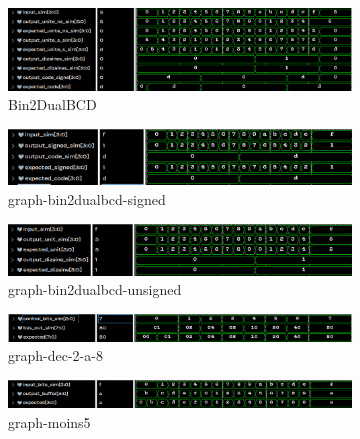 \begin{figure}[H]
  \centering
	\begin{subfigure}{.496\linewidth}
		\centering
		\includegraphics[width=\textwidth]{assets/img/graph-bin2dualbcd.png}
		\caption{Bin2DualBCD}
	\end{subfigure}
	\begin{subfigure}{.496\linewidth}
		\centering
		\includegraphics[width=\textwidth]{assets/img/graph-bin2dualbcd-signed.png}
		\caption{graph-bin2dualbcd-signed}
	\end{subfigure}
	\begin{subfigure}{.496\linewidth}
		\centering
		\includegraphics[width=\textwidth]{assets/img/graph-bin2dualbcd-unsigned.png}
		\caption{graph-bin2dualbcd-unsigned}
	\end{subfigure}
	\begin{subfigure}{.496\linewidth}
		\centering
		\includegraphics[width=\textwidth]{assets/img/graph-dec-2-a-8.png}
		\caption{graph-dec-2-a-8}
	\end{subfigure}
	\begin{subfigure}{.496\linewidth}
		\centering
		\includegraphics[width=\textwidth]{assets/img/graph-moins5.png}
		\caption{graph-moins5}
	\end{subfigure}
	\begin{subfigure}{.496\linewidth}

\end{subfigure}
\end{figure}
